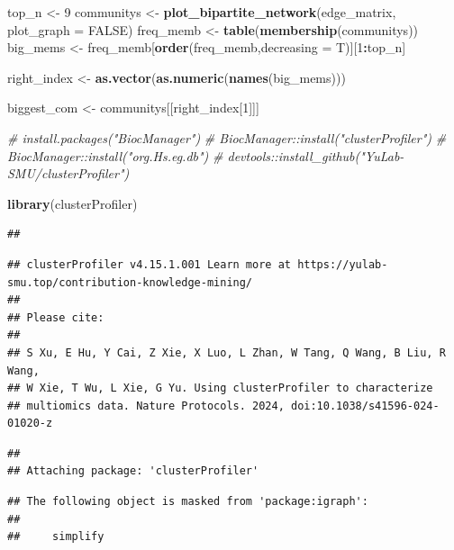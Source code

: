 \documentclass[
]{article}
\newenvironment{Shaded}{\begin{snugshade}}{\end{snugshade}}
\newcommand{\AttributeTok}[1]{\textcolor[rgb]{0.13,0.29,0.53}{#1}}
\newcommand{\CommentTok}[1]{\textcolor[rgb]{0.56,0.35,0.01}{\textit{#1}}}
\newcommand{\ConstantTok}[1]{\textcolor[rgb]{0.56,0.35,0.01}{#1}}
\newcommand{\DecValTok}[1]{\textcolor[rgb]{0.00,0.00,0.81}{#1}}
\newcommand{\FunctionTok}[1]{\textcolor[rgb]{0.13,0.29,0.53}{\textbf{#1}}}
\newcommand{\NormalTok}[1]{#1}
\newcommand{\OtherTok}[1]{\textcolor[rgb]{0.56,0.35,0.01}{#1}}
\newcommand{\SpecialCharTok}[1]{\textcolor[rgb]{0.81,0.36,0.00}{\textbf{#1}}}
\begin{document}
\begin{Shaded}
\begin{Highlighting}[]
\NormalTok{top\_n }\OtherTok{\textless{}{-}} \DecValTok{9}
\NormalTok{communitys }\OtherTok{\textless{}{-}} \FunctionTok{plot\_bipartite\_network}\NormalTok{(edge\_matrix, }\AttributeTok{plot\_graph =} \ConstantTok{FALSE}\NormalTok{)}
\NormalTok{freq\_memb }\OtherTok{\textless{}{-}} \FunctionTok{table}\NormalTok{(}\FunctionTok{membership}\NormalTok{(communitys))}
\NormalTok{big\_mems }\OtherTok{\textless{}{-}}\NormalTok{ freq\_memb[}\FunctionTok{order}\NormalTok{(freq\_memb,}\AttributeTok{decreasing =}\NormalTok{ T)][}\DecValTok{1}\SpecialCharTok{:}\NormalTok{top\_n]}

\NormalTok{right\_index }\OtherTok{\textless{}{-}} \FunctionTok{as.vector}\NormalTok{(}\FunctionTok{as.numeric}\NormalTok{(}\FunctionTok{names}\NormalTok{(big\_mems)))}



\NormalTok{biggest\_com }\OtherTok{\textless{}{-}}\NormalTok{ communitys[[right\_index[}\DecValTok{1}\NormalTok{]]]}


\CommentTok{\# install.packages("BiocManager")}
\CommentTok{\# BiocManager::install("clusterProfiler")}
\CommentTok{\# BiocManager::install("org.Hs.eg.db")}
\CommentTok{\# devtools::install\_github("YuLab{-}SMU/clusterProfiler")}

\FunctionTok{library}\NormalTok{(clusterProfiler)}
\end{Highlighting}
\end{Shaded}

\begin{verbatim}
## 
\end{verbatim}

\begin{verbatim}
## clusterProfiler v4.15.1.001 Learn more at https://yulab-smu.top/contribution-knowledge-mining/
## 
## Please cite:
## 
## S Xu, E Hu, Y Cai, Z Xie, X Luo, L Zhan, W Tang, Q Wang, B Liu, R Wang,
## W Xie, T Wu, L Xie, G Yu. Using clusterProfiler to characterize
## multiomics data. Nature Protocols. 2024, doi:10.1038/s41596-024-01020-z
\end{verbatim}

\begin{verbatim}
## 
## Attaching package: 'clusterProfiler'
\end{verbatim}

\begin{verbatim}
## The following object is masked from 'package:igraph':
## 
##     simplify
\end{verbatim}
\end{document}
